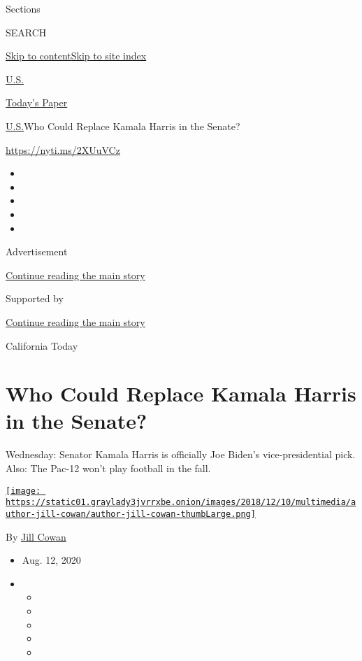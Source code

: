 Sections

SEARCH

\protect\hyperlink{site-content}{Skip to
content}\protect\hyperlink{site-index}{Skip to site index}

\href{https://www.nytimes3xbfgragh.onion/section/us}{U.S.}

\href{https://myaccount.nytimes3xbfgragh.onion/auth/login?response_type=cookie\&client_id=vi}{}

\href{https://www.nytimes3xbfgragh.onion/section/todayspaper}{Today's
Paper}

\href{/section/us}{U.S.}\textbar{}Who Could Replace Kamala Harris in the
Senate?

\url{https://nyti.ms/2XUuVCz}

\begin{itemize}
\item
\item
\item
\item
\item
\end{itemize}

Advertisement

\protect\hyperlink{after-top}{Continue reading the main story}

Supported by

\protect\hyperlink{after-sponsor}{Continue reading the main story}

California Today

\hypertarget{who-could-replace-kamala-harris-in-the-senate}{%
\section{Who Could Replace Kamala Harris in the
Senate?}\label{who-could-replace-kamala-harris-in-the-senate}}

Wednesday: Senator Kamala Harris is officially Joe Biden's
vice-presidential pick. Also: The Pac-12 won't play football in the
fall.

\href{https://www.nytimes3xbfgragh.onion/by/jill-cowan}{\texttt{[image: https://static01.graylady3jvrrxbe.onion/images/2018/12/10/multimedia/author-jill-cowan/author-jill-cowan-thumbLarge.png]}}

By \href{https://www.nytimes3xbfgragh.onion/by/jill-cowan}{Jill Cowan}

\begin{itemize}
\item
  Aug. 12, 2020
\item
  \begin{itemize}
  \item
  \item
  \item
  \item
  \item
  \end{itemize}
\end{itemize}


